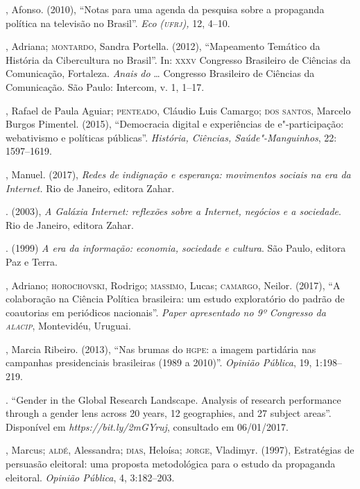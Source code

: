 \begin{bibliohedra}
, Afonso. (2010), ``Notas para uma agenda da pesquisa sobre a
propaganda política na televisão no Brasil''. \emph{Eco} \emph{(\textsc{ufrj}),}
12, 4--10.

, Adriana; \textsc{montardo}, Sandra Portella. (2012), ``Mapeamento
Temático da História da Cibercultura no Brasil''. In: \textsc{xxxv} Congresso
Brasileiro de Ciências da Comunicação, Fortaleza. \emph{Anais do} \ldots{}
Congresso Brasileiro de Ciências da Comunicação. São Paulo: Intercom, v.
1, 1--17.

, Rafael de Paula Aguiar; \textsc{penteado}, Cláudio Luis Camargo; \textsc{dos
santos}, Marcelo Burgos Pimentel. (2015), ``Democracia digital e
experiências de e"-participação: webativismo e políticas públicas''.
\emph{História, Ciências, Saúde"-Manguinhos}, 22: 1597--1619.

, Manuel. (2017), \emph{Redes de indignação e esperança:
movimentos sociais na era da Internet.} Rio de Janeiro, editora Zahar.

\titidem. (2003), \emph{A Galáxia Internet: reflexões sobre a
Internet, negócios e a sociedade}. Rio de Janeiro, editora Zahar.

\titidem. (1999) \emph{A era da informação: economia, sociedade
e cultura}. São Paulo, editora Paz e Terra.

, Adriano; \textsc{horochovski}, Rodrigo; \textsc{massimo}, Lucas; \textsc{camargo}, Neilor.
(2017), ``A colaboração na Ciência Política brasileira: um estudo
exploratório do padrão de coautorias em periódicos nacionais''.
\emph{Paper apresentado no 9º Congresso da \textsc{alacip}}, Montevidéu,
Uruguai.

, Marcia Ribeiro. (2013), ``Nas brumas do \textsc{hgpe}: a imagem partidária
nas campanhas presidenciais brasileiras (1989 a 2010)''. \emph{Opinião
Pública}, 19, 1:198--219.

. ``Gender in the Global Research Landscape. Analysis of
research performance through a gender lens across 20 years, 12
geographies, and 27 subject areas''. Disponível em
\emph{https://bit.ly/2mGYruj}, consultado em 06/01/2017.

, Marcus; \textsc{aldé}, Alessandra; \textsc{dias}, Heloísa; \textsc{jorge}, Vladimyr.
(1997), Estratégias de persuasão eleitoral: uma proposta metodológica
para o estudo da propaganda eleitoral. \emph{Opinião Pública}, 4,
3:182--203.


\end{bibliohedra}
